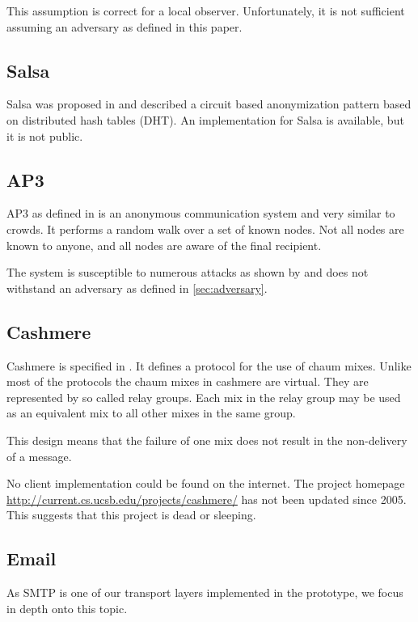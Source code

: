 This assumption is correct for a local observer. Unfortunately, it is not sufficient assuming an adversary as defined in this paper.

\subsection{Salsa}
Salsa was proposed in \cite{Salsa} and described a circuit based anonymization pattern based on distributed hash tables (DHT). An implementation for Salsa is available, but it is not public.

\subsection{AP3}
AP3 as defined in \cite{mislove2004ap3} is an anonymous communication system and very similar to crowds. It performs a random walk over a set of known nodes. Not all nodes are known to anyone, and all nodes are aware of the final recipient. 

The system is susceptible to numerous attacks as shown by \cite{ccs2008:mittal} and does not withstand an adversary as defined in \ref{sec:adversary}.

\subsection{Cashmere}
Cashmere is specified in \cite{zhuang2005cashmere}. It defines a protocol for the use of chaum mixes. Unlike most of the protocols the chaum mixes in cashmere are virtual. They are represented by so called relay groups. Each mix in the relay group may be used as an equivalent mix to all other mixes in the same group. 

This design means that the failure of one mix does not result in the non-delivery of a message.

No client implementation could be found on the internet. The project homepage \href{http://current.cs.ucsb.edu/projects/cashmere/}{http://current.cs.ucsb.edu/projects/cashmere/} has not been updated since 2005. This suggests that this project is dead or sleeping.

\subsection{Email\label{sec:mailTransport}}
As SMTP is one of our transport layers implemented in the prototype, we focus in depth onto this topic.

